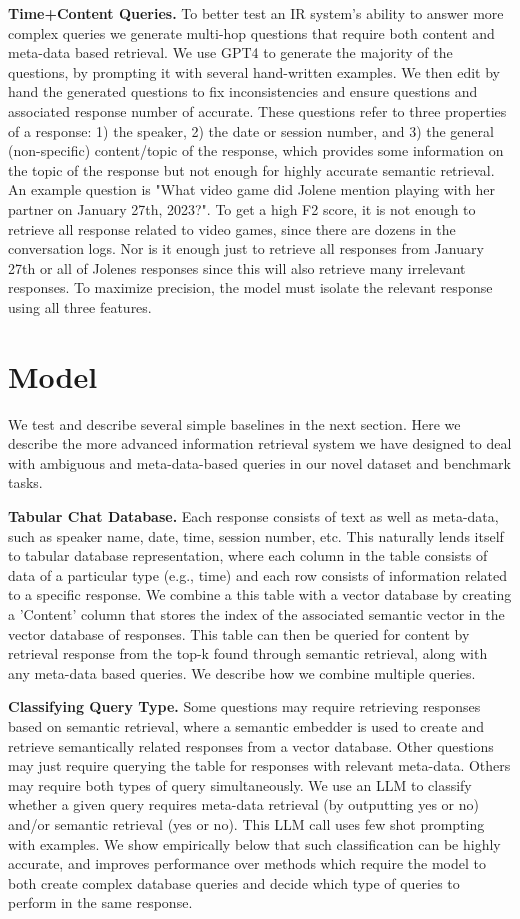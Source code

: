 \documentclass{article}
\begin{document}
\textbf{Time+Content Queries.} To better test an IR system's ability to answer more complex queries we generate multi-hop questions that require both content and meta-data based retrieval. We use GPT4 to generate the majority of the questions, by prompting it with several hand-written examples. We then edit by hand the generated questions to fix inconsistencies and ensure questions and associated response number of accurate. These questions refer to three properties of a response: 1) the speaker, 2) the date or session number, and 3) the general (non-specific) content/topic of the response, which provides some information on the topic of the response but not enough for highly accurate semantic retrieval. An example question is "What video game did Jolene mention playing with her partner on January 27th, 2023?". To get a high F2 score, it is not enough to retrieve all response related to video games, since there are dozens in the conversation logs. Nor is it enough just to retrieve all responses from January 27th or all of Jolenes responses since this will also retrieve many irrelevant responses. To maximize precision, the model must isolate the relevant response using all three features.

\section{Model}
We test and describe several simple baselines in the next section. Here we describe the more advanced information retrieval system we have designed to deal with ambiguous and meta-data-based queries in our novel dataset and benchmark tasks.

\textbf{Tabular Chat Database.} Each response consists of text as well as meta-data, such as speaker name, date, time, session number, etc. This naturally lends itself to tabular database representation, where each column in the table consists of data of a particular type (e.g., time) and each row consists of information related to a specific response. We combine a this table with a vector database by creating a 'Content' column that stores the index of the associated semantic vector in the vector database of responses. This table can then be queried for content by retrieval response from the top-k found through semantic retrieval, along with any meta-data based queries. We describe how we combine multiple queries.

\textbf{Classifying Query Type.} Some questions may require retrieving responses based on semantic retrieval, where a semantic embedder is used to create and retrieve semantically related responses from a vector database. Other questions may just require querying the table for responses with relevant meta-data. Others may require both types of query simultaneously. We use an LLM to classify whether a given query requires meta-data retrieval (by outputting yes or no) and/or semantic retrieval (yes or no). This LLM call uses few shot prompting with examples. We show empirically below that such classification can be highly accurate, and improves performance over methods which require the model to both create complex database queries and decide which type of queries to perform in the same response.
\end{document}
